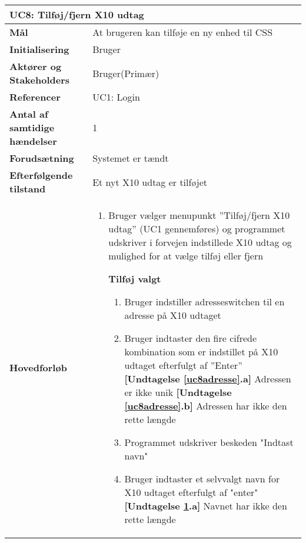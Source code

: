 \begin{table}[H] \centering
\begin{tabular}{|p{5cm}|p{9cm}|}
	\hline
		\multicolumn{2}{|l|}{\textbf{UC8: Tilføj/fjern X10 udtag}} \\\hline
		
		\textbf{Mål}							&At brugeren kan tilføje en ny enhed til CSS						\\\hline
		\textbf{Initialisering}				&Bruger					 										\\\hline
		\textbf{Aktører og Stakeholders}		&Bruger(Primær)					\\\hline
		\textbf{Referencer}					&UC1: Login													\\\hline
		\textbf{Antal af samtidige hændelser}&1 																\\\hline
		\textbf{Forudsætning}				&Systemet er tændt															\\\hline
		\textbf{Efterfølgende tilstand}		&Et nyt X10 udtag er tilføjet 					\\\hline
		\textbf{Hovedforløb}					
			&\begin{enumerate}
				
				\item Bruger vælger menupunkt ''Tilføj/fjern X10 udtag'' (UC1 gennemføres) og programmet udskriver i forvejen indstillede X10 udtag og mulighed for at vælge tilføj eller fjern
					
				\subitem \textbf{Tilføj valgt}			
				\begin{enumerate}
					\item \label{uc8indstilAdresse} Bruger indstiller adresseswitchen til en adresse på X10 udtaget

					\item \label{uc8adresse} Bruger indtaster den fire cifrede kombination som er indstillet på X10 udtaget efterfulgt af ''Enter''\newline
						\textbf{[Undtagelse \ref{uc8adresse}.a]} Adressen er ikke unik\newline
						\textbf{[Undtagelse \ref{uc8adresse}.b]} Adressen har ikke den rette længde
				
					\item \label{uc8indstilNavn} Programmet udskriver beskeden "Indtast navn"
				
					\item \label{uc8navn} Bruger indtaster et selvvalgt navn for X10 udtaget efterfulgt af "enter"\newline
						\textbf{[Undtagelse \ref{uc8navn}.a]} Navnet har ikke den rette længde
				

\end{enumerate}
\end{enumerate}
\end{tabular}
\end{table}
